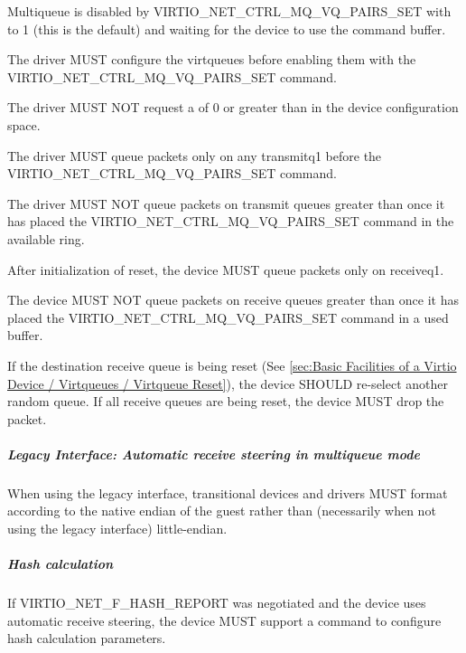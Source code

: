 Multiqueue is disabled by VIRTIO_NET_CTRL_MQ_VQ_PAIRS_SET with  to 1 (this is
the default) and waiting for the device to use the command buffer.


The driver MUST configure the virtqueues before enabling them with the
VIRTIO_NET_CTRL_MQ_VQ_PAIRS_SET command.

The driver MUST NOT request a  of 0 or
greater than  in the device configuration space.

The driver MUST queue packets only on any transmitq1 before the
VIRTIO_NET_CTRL_MQ_VQ_PAIRS_SET command.

The driver MUST NOT queue packets on transmit queues greater than
 once it has placed the VIRTIO_NET_CTRL_MQ_VQ_PAIRS_SET command in the available ring.


After initialization of reset, the device MUST queue packets only on receiveq1.

The device MUST NOT queue packets on receive queues greater than
 once it has placed the
VIRTIO_NET_CTRL_MQ_VQ_PAIRS_SET command in a used buffer.

If the destination receive queue is being reset (See \ref{sec:Basic Facilities of a Virtio Device / Virtqueues / Virtqueue Reset}),
the device SHOULD re-select another random queue. If all receive queues are
being reset, the device MUST drop the packet.

\subparagraph{Legacy Interface: Automatic receive steering in multiqueue mode}\label{sec:Device Types / Network Device / Device Operation / Control Virtqueue / Automatic receive steering in multiqueue mode / Legacy Interface: Automatic receive steering in multiqueue mode}
When using the legacy interface, transitional devices and drivers
MUST format 
according to the native endian of the guest rather than
(necessarily when not using the legacy interface) little-endian.

\subparagraph{Hash calculation}\label{sec:Device Types / Network Device / Device Operation / Control Virtqueue / Automatic receive steering in multiqueue mode / Hash calculation}
If VIRTIO_NET_F_HASH_REPORT was negotiated and the device uses automatic receive steering,
the device MUST support a command to configure hash calculation parameters.

